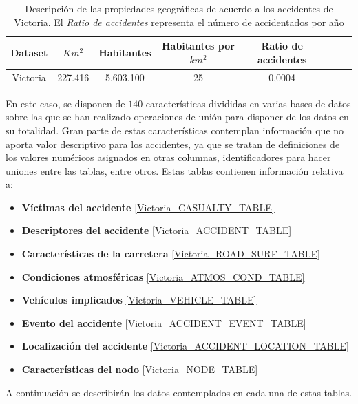 \begin{table}[H]
	\begin{center}
		\begin{tabular}{|c|c||c|c|c|c|c|c|}
			\hline
			\textbf{Dataset} & \textbf{$Km^2$} & \textbf{Habitantes} & \textbf{Habitantes por $km^2$} & \textbf{Ratio de accidentes}
			\\ \hline \hline
			Victoria & 227.416 &  5.603.100  & 25  & 0,0004\\ \hline
		\end{tabular}
	\end{center}
	\caption[Descripción de las propiedades geográficas de acuerdo a los accidentes de Victoria]{Descripción de las propiedades geográficas de acuerdo a los accidentes de Victoria. El \textit{Ratio de accidentes} representa el número de accidentados por año}
	\label{Victoria_statistics}
\end{table}


En este caso, se disponen de $140$ características divididas en varias bases de datos sobre las que se han realizado operaciones de unión para disponer de los datos en su totalidad. Gran parte de estas características contemplan información que no aporta valor descriptivo para los accidentes, ya que se tratan de definiciones de los valores numéricos asignados en otras columnas, identificadores para hacer uniones entre las tablas, entre otros. Estas tablas contienen información relativa a:

\begin{itemize}
	\item \textbf{Víctimas del accidente} \ref{Victoria_CASUALTY_TABLE}
	\item \textbf{Descriptores del accidente} \ref{Victoria_ACCIDENT_TABLE}
	\item \textbf{Características de la carretera} \ref{Victoria_ROAD_SURF_TABLE}
	\item \textbf{Condiciones atmosféricas} \ref{Victoria_ATMOS_COND_TABLE}
	\item \textbf{Vehículos implicados} \ref{Victoria_VEHICLE_TABLE}
	\item \textbf{Evento del accidente} \ref{Victoria_ACCIDENT_EVENT_TABLE}
	\item \textbf{Localización del accidente} \ref{Victoria_ACCIDENT_LOCATION_TABLE}
	\item \textbf{Características del nodo} \ref{Victoria_NODE_TABLE}
\end{itemize}

A continuación se describirán los datos contemplados en cada una de estas tablas.

